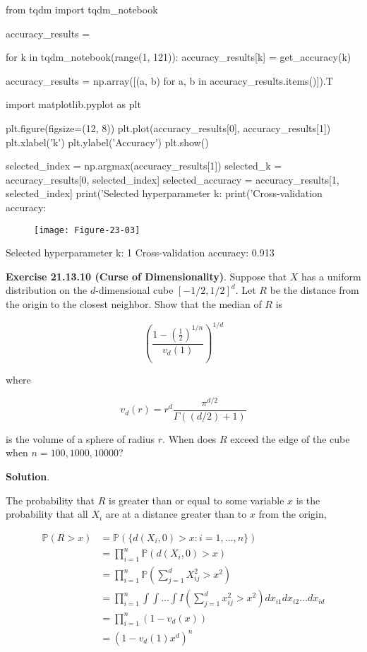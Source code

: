 \begin{python}
from tqdm import tqdm_notebook

accuracy_results = {}

for k in tqdm_notebook(range(1, 121)):
    accuracy_results[k] = get_accuracy(k)
    
accuracy_results = np.array([(a, b) for a, b in accuracy_results.items()]).T
\end{python}

\begin{python}
import matplotlib.pyplot as plt

plt.figure(figsize=(12, 8))
plt.plot(accuracy_results[0], accuracy_results[1])
plt.xlabel('k')
plt.ylabel('Accuracy')
plt.show()

selected_index = np.argmax(accuracy_results[1])
selected_k = accuracy_results[0, selected_index]
selected_accuracy = accuracy_results[1, selected_index]
print('Selected hyperparameter k: %
print('Cross-validation accuracy: %
\end{python}

\begin{figure}[H]
\texttt{[image: Figure-23-03]}
\end{figure}

\begin{console}
Selected hyperparameter k: 1
Cross-validation accuracy: 0.913
\end{console}

\textbf{Exercise 21.13.10 (Curse of Dimensionality)}. Suppose that \(X\)
has a uniform distribution on the \(d\)-dimensional cube
\([-1/2, 1/2]^d\). Let \(R\) be the distance from the origin to the
closest neighbor. Show that the median of \(R\) is

\[ \left( \frac{1 - \left(\frac{1}{2}\right)^{1/n}}{v_d(1)} \right)^{1/d}\]

where

\[ v_d(r) = r^d \frac{\pi^{d/2}}{\Gamma((d/2) + 1)} \]

is the volume of a sphere of radius \(r\). When does \(R\) exceed the
edge of the cube when \(n = 100, 1000, 10000\)?

\textbf{Solution}.

The probability that \(R\) is greater than or equal to some variable
\(x\) is the probability that all \(X_i\) are at a distance greater than
to \(x\) from the origin,

\[
\begin{align}
\mathbb{P}(R > x) &= \mathbb{P}(\{ d(X_i, 0) > x : i = 1, \dots, n \}) \\
&= \prod_{i=1}^n \mathbb{P}( d(X_i, 0) > x  ) \\
&= \prod_{i=1}^n \mathbb{P}\left( \sum_{j=1}^d X_{ij}^2 > x^2  \right) \\
&= \prod_{i=1}^n \int \int \dots \int I \left( \sum_{j=1}^d x_{ij}^2 > x^2 \right) dx_{i1} dx_{i2} \dots dx_{id} \\
&= \prod_{i=1}^n (1 - v_d(x)) \\
&= \left(1 - v_d(1) x^d\right)^n
\end{align}
\]

